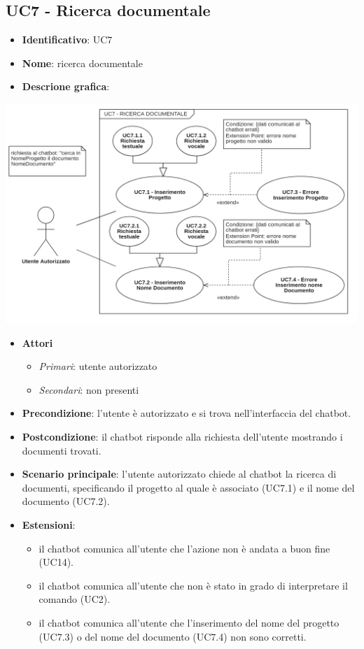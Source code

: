 \subsection{UC7 - Ricerca documentale}
\begin{itemize}
    \item \textbf{Identificativo}: UC7
    \item \textbf{Nome}: ricerca documentale
    \item \textbf{Descrione grafica}:
\end{itemize}
\begin{center}
    \includegraphics{images/UC7.png} 
\end{center}
 \begin{itemize}
    \item \textbf{Attori}
 \begin{itemize} 
    \item \textit{Primari}: utente autorizzato
    \item \textit{Secondari}: non presenti
 \end{itemize}
 \item \textbf{Precondizione}: l'utente è autorizzato e si trova nell'interfaccia del chatbot.
 \item \textbf{Postcondizione}: il chatbot risponde alla richiesta dell'utente mostrando i documenti trovati.
 \item \textbf{Scenario principale}: l'utente autorizzato chiede al chatbot la ricerca di documenti, specificando il progetto al quale è associato (UC7.1) e il nome del documento (UC7.2).
 \item \textbf{Estensioni}: 
 \begin{itemize} 
    \item il chatbot comunica all'utente che l'azione non è andata a buon fine (UC14).
    \item il chatbot comunica all'utente che non è stato in grado di interpretare il comando (UC2).
    \item il chatbot comunica all'utente che l'inserimento del nome del progetto (UC7.3) o del nome del documento (UC7.4) non sono corretti.
 \end{itemize}
\end{itemize}
\newpage
